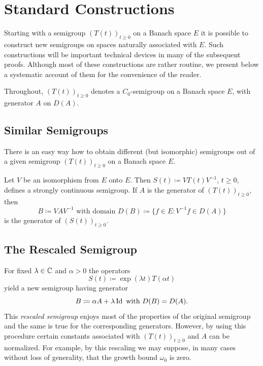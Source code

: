 \section{Standard Constructions}\label{sec:a1-3}%
Starting with a semigroup $(T(t))_{t \geq 0}$ on a Banach space $E$ it is possible to construct new semigroups on spaces naturally associated with $E$.
Such constructions will be important technical devices in many of the subsequent proofs.
Although most of these constructions are rather routine, we present below a systematic account of them for the convenience of the reader.

Throughout, $(T(t))_{t \geq 0}$ denotes a $C_0$-semigroup on a Banach space $E$, with generator $A$ on $D(A)$.
\subsection{Similar Semigroups}\label{subsec:a1-3.1}%

There is an easy way how to obtain different (but isomorphic) semigroups out of a given semigroup $(T(t))_{t \geq 0}$ on a Banach space $E$.

Let $V$ be an isomorphism from $E$ onto $E$.
Then $S(t) \coloneq VT(t)V^{-1}$, $t \geq 0$, defines a strongly continuous semigroup.
If\/ $A$ is the generator of\/ $(T(t))_{t \geq 0}$, then
\[
    B \coloneq VAV^{-1} \text{ with domain } D(B) \coloneq \{f \in E \colon V^{-1}f \in D(A)\}
\]
is the generator of\/ $(S(t))_{t \geq 0}$.
\subsection{The Rescaled Semigroup}\label{subsec:a1-3.2}%
For fixed $\lambda \in \mathbb{C}$ and $\alpha > 0$ the operators
\[
    S(t) \coloneq \exp(\lambda t)T(\alpha t)
\]
yield a new semigroup having generator
\[
    B \coloneq \alpha A + \lambda \operatorname{Id} \text{ with } D(B) = D(A) .
\]
This \emph{rescaled semigroup} enjoys most of the properties of the original semigroup and the same is true for the corresponding generators.
However, by using this procedure certain constants associated with $(T(t))_{t \geq 0}$ and $A$ can be normalized.
For example, by this rescaling we may suppose, in many cases without loss of generality, that the growth bound $\omega_{0}$ is zero.

